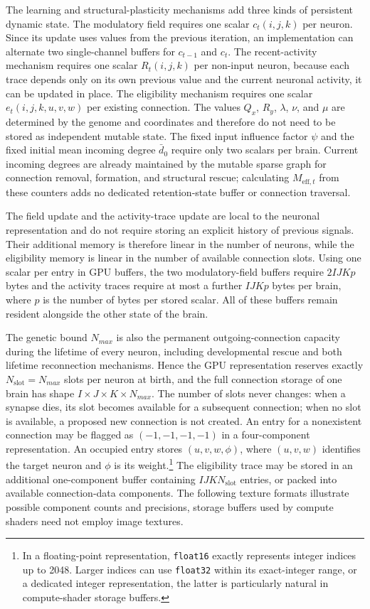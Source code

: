 \documentclass[12pt,a4paper]{article}
\begin{document}
	The learning and structural-plasticity mechanisms add three kinds of persistent dynamic state. The modulatory field requires one scalar $c_t(i,j,k)$ per neuron. Since its update uses values from the previous iteration, an implementation can alternate two single-channel buffers for $c_{t-1}$ and $c_t$. The recent-activity mechanism requires one scalar $R_t(i,j,k)$ per non-input neuron, because each trace depends only on its own previous value and the current neuronal activity, it can be updated in place. The eligibility mechanism requires one scalar $e_t(i,j,k,u,v,w)$ per existing connection. The values $Q_x$, $R_y$, $\lambda$, $\nu$, and $\mu$ are determined by the genome and coordinates and therefore do not need to be stored as independent mutable state. The fixed input influence factor $\psi$ and the fixed initial mean incoming degree $\bar d_0$ require only two scalars per brain. Current incoming degrees are already maintained by the mutable sparse graph for connection removal, formation, and structural rescue; calculating $M_{\mathrm{eff},t}$ from these counters adds no dedicated retention-state buffer or connection traversal.

	The field update and the activity-trace update are local to the neuronal representation and do not require storing an explicit history of previous signals. Their additional memory is therefore linear in the number of neurons, while the eligibility memory is linear in the number of available connection slots. Using one scalar per entry in GPU buffers, the two modulatory-field buffers require $2IJKp$ bytes and the activity traces require at most a further $IJKp$ bytes per brain, where $p$ is the number of bytes per stored scalar. All of these buffers remain resident alongside the other state of the brain.

	The genetic bound $N_{max}$ is also the permanent outgoing-connection capacity during the lifetime of every neuron, including developmental rescue and both lifetime reconnection mechanisms. Hence the GPU representation reserves exactly $N_{\mathrm{slot}}=N_{max}$ slots per neuron at birth, and the full connection storage of one brain has shape $I \times J \times K \times N_{max}$. The number of slots never changes: when a synapse dies, its slot becomes available for a subsequent connection; when no slot is available, a proposed new connection is not created. An entry for a nonexistent connection may be flagged as $(-1,-1,-1,-1)$ in a four-component representation. An occupied entry stores $(u,v,w,\phi)$, where $(u,v,w)$ identifies the target neuron and $\phi$ is its weight.\footnote{In a floating-point representation, \texttt{float16} exactly represents integer indices up to 2048. Larger indices can use \texttt{float32} within its exact-integer range, or a dedicated integer representation, the latter is particularly natural in compute-shader storage buffers.} The eligibility trace may be stored in an additional one-component buffer containing $IJKN_{\mathrm{slot}}$ entries, or packed into available connection-data components. The following texture formats illustrate possible component counts and precisions, storage buffers used by compute shaders need not employ image textures.
	
\end{document}
